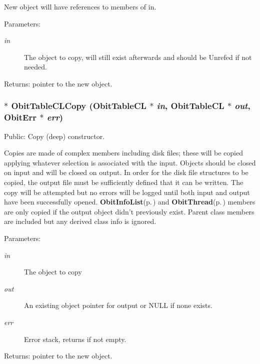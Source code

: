 New object will have references to members of in. \begin{Desc}
\item[Parameters:]
\begin{description}
\item[{\em in}]The object to copy, will still exist afterwards and should be Unrefed if not needed. \end{description}
\end{Desc}
\begin{Desc}
\item[Returns:]pointer to the new object. \end{Desc}
\subsubsection{$\ast$ Obit\-Table\-CLCopy ({\bf Obit\-Table\-CL} $\ast$ {\em in}, {\bf Obit\-Table\-CL} $\ast$ {\em out}, {\bf Obit\-Err} $\ast$ {\em err})}\label{ObitTableCL_8c_a20}


Public: Copy (deep) constructor. 

Copies are made of complex members including disk files; these will be copied applying whatever selection is associated with the input. Objects should be closed on input and will be closed on output. In order for the disk file structures to be copied, the output file must be sufficiently defined that it can be written. The copy will be attempted but no errors will be logged until both input and output have been successfully opened. {\bf Obit\-Info\-List}{\rm (p.\,\pageref{structObitInfoList})} and {\bf Obit\-Thread}{\rm (p.\,\pageref{structObitThread})} members are only copied if the output object didn't previously exist. Parent class members are included but any derived class info is ignored. \begin{Desc}
\item[Parameters:]
\begin{description}
\item[{\em in}]The object to copy \item[{\em out}]An existing object pointer for output or NULL if none exists. \item[{\em err}]Error stack, returns if not empty. \end{description}
\end{Desc}
\begin{Desc}
\item[Returns:]pointer to the new object. \end{Desc}
